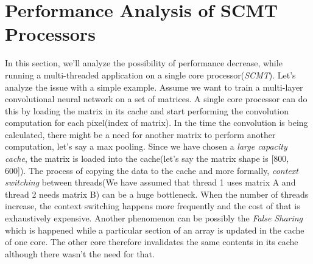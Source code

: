 \documentclass[12pt]{article}
\numberwithin{equation}{section}
\numberwithin{table}{section}
\numberwithin{figure}{section}
\begin{document}
\section{Performance Analysis of SCMT Processors}
In this section, we'll analyze the possibility of performance decrease, while running a multi-threaded application on a single core processor(\textit{SCMT}). Let's analyze the issue with a simple example. Assume we want to train a multi-layer convolutional neural network on a set of matrices. A single core processor can do this by loading the matrix in its cache and start performing the convolution computation for each pixel(index of matrix). In the time the convolution is being calculated, there might be a need for another matrix to perform another computation, let's say a max pooling. Since we have chosen a \textit{large capacity cache}, the matrix is loaded into the cache(let's say the matrix shape is [800, 600]). The process of copying the data to the cache and more formally, \textit{context switching} between threads(We have assumed that thread 1 uses matrix A and thread 2 needs matrix B) can be a huge bottleneck. When the number of threads increase, the context switching happens more frequently and the cost of that is exhaustively expensive. Another phenomenon can be possibly the \textit{False Sharing} which is happened while a particular section of an array is updated in the cache of one core. The other core therefore invalidates the same contents in its cache although there wasn't the need for that.
\newpage
\end{document}
